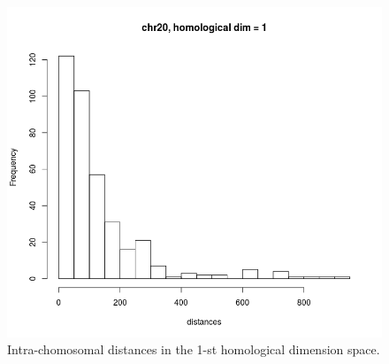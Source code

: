 \documentclass[12pt,a4paper]{article}
\begin{document}
\begin{figure}[hbtp]
\centering
\includegraphics[scale=0.75]{2wd_chr20_dim1_28clouds.png}
\caption{Intra-chomosomal distances in the 1-st homological dimension space.}
\label{fig:dist_1d_intra_chr20}
\end{figure}
\end{document}
